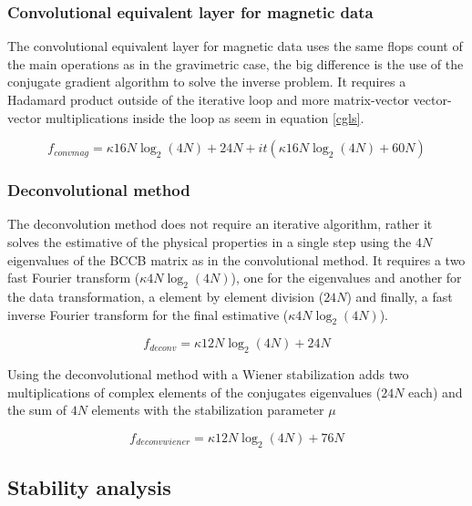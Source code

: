 \documentclass[utf8]{FrontiersinHarvard} %
\begin{document}
\subsubsection{Convolutional equivalent layer for magnetic data \citep{takahashi2022convolutional}}

The convolutional equivalent layer for magnetic data uses the same flops count of the main operations as in the gravimetric case, the big difference is the use of the conjugate gradient algorithm to solve the inverse problem.
It requires a Hadamard product outside of the iterative loop and more matrix-vector vector-vector multiplications inside the loop as seem in equation \ref{cgls}.

\begin{equation}
	f_{convmag} = \kappa16N\log_2(4N) + 24N + it(\kappa16N\log_2(4N) + 60N)
\label{convmag}
\end{equation}

\subsubsection{Deconvolutional method}

The deconvolution method does not require an iterative algorithm, rather it solves the estimative of the physical properties in a single step using the $4N$ eigenvalues of the BCCB matrix as in the convolutional method. It requires a two fast Fourier transform ($\kappa4N\log_2(4N)$), one for the eigenvalues and another for the data transformation, a element by element division ($24N$) and finally, a fast inverse Fourier transform for the final estimative ($\kappa4N\log_2(4N)$).

\begin{equation}
	f_{deconv} = \kappa12N\log_2(4N) + 24N
	\label{deconv}
\end{equation}

Using the deconvolutional method with a Wiener stabilization adds two multiplications of complex elements of the conjugates eigenvalues ($24N$ each) and the sum of $4N$ elements with the stabilization parameter $\mu$

\begin{equation}
	f_{deconvwiener} = \kappa12N\log_2(4N) + 76N
	\label{deconvwiener}
\end{equation}

\subsection{Stability analysis}
\end{document}
